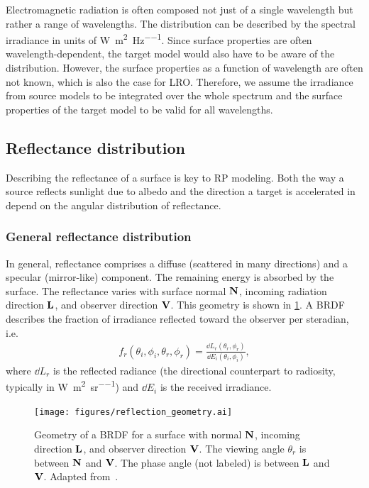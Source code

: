 Electromagnetic radiation is often composed not just of a single wavelength but rather a range of wavelengths. The distribution can be described by the spectral irradiance in units of \unit{\W\per\square\m\per\Hz}. Since surface properties are often wavelength-dependent, the target model would also have to be aware of the distribution. However, the surface properties as a function of wavelength are often not known, which is also the case for \gls{LRO}. Therefore, we assume the irradiance from source models to be integrated over the whole spectrum and the surface properties of the target model to be valid for all wavelengths.




\subsection{Reflectance distribution}
\label{subsec:general-reflectance-distribution}

Describing the reflectance of a surface is key to \gls{RP} modeling. Both the way a source reflects sunlight due to albedo and the direction a target is accelerated in depend on the angular distribution of reflectance.

\subsubsection{General reflectance distribution}
In general, reflectance comprises a diffuse (scattered in many directions) and a specular (mirror-like) component. The remaining energy is absorbed by the surface. The reflectance varies with surface normal $\vb N$, incoming radiation direction $\vb L$, and observer direction $\vb V$. This geometry is shown in \cref{fig:reflection-geometry}. A \gls{BRDF} describes the fraction of irradiance reflected toward the observer per steradian, i.e.~\cite{Wetterer2014}
\begin{align}
    f_r (\theta_i, \phi_i, \theta_r, \phi_r)
    = \frac{\dd{L_r(\theta_r, \phi_r)}}
    {\dd{E_i(\theta_i, \phi_i)}},
\end{align}
where $\dd{L_r}$ is the reflected radiance (the directional counterpart to radiosity, typically in \unit{\W\per\square\m\per\steradian}) and $\dd{E_i}$ is the received irradiance.


\begin{figure}[b]
    \centering
    \texttt{[image: figures/reflection\_geometry.ai]}
    \caption{Geometry of a \gls{BRDF} for a surface with normal $\vb N$, incoming direction $\vb L$, and observer direction $\vb V$. The viewing angle $\theta_r$ is between $\vb N$ and $\vb V$. The phase angle (not labeled) is between $\vb L$ and $\vb V$. Adapted from~\cite{Wetterer2014}.}
    \label{fig:reflection-geometry}
\end{figure}

